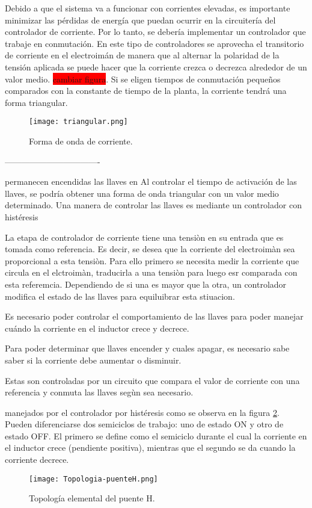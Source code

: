 Debido a que el sistema va a funcionar con corrientes elevadas, es importante minimizar las pérdidas de energía que puedan ocurrir en la circuitería del controlador de corriente. Por lo tanto, se debería implementar un controlador que trabaje en conmutación.  En este tipo de controladores se aprovecha el transitorio de corriente en el electroimán de manera que al alternar la polaridad de la tensión aplicada se puede hacer que la corriente crezca o decrezca alrededor de un valor medio. \colorbox{red}{cambiar figura}. Si se eligen tiempos de conmutación pequeños comparados con la constante de tiempo de la planta, la corriente tendrá una forma triangular.

\begin{figure}[H]
	\centering
	\texttt{[image: triangular.png]}
	\caption{Forma de onda de corriente.}
	\label{fig:img_corriente_triangular}
\end{figure}


----------------------------------

permanecen encendidas las llaves en 
Al controlar el tiempo de activación de las llaves, se podría obtener una forma de onda triangular con un valor medio determinado. Una manera de controlar las llaves es mediante un controlador con histéresis

La etapa de controlador de corriente tiene una tensiòn en su entrada que es tomada como referencia. Es decir, se desea que la corriente del electroimàn sea proporcional a esta tensiòn. Para ello primero se necesita medir la corriente que circula en el elctroimàn, traducirla a una tensiòn para luego esr comparada con esta referemcia. Dependiendo de si una es mayor que la otra, un controlador modifica el estado de las llaves para equiluibrar esta stiuacion. 

Es necesario poder controlar el comportamiento de las llaves para poder manejar cuándo la corriente en el inductor crece y decrece. 

Para poder determinar que llaves encender y cuales apagar, es necesario sabe saber si la corriente debe aumentar o disminuir.

Estas son controladas por un circuito que compara el valor de corriente con una referencia y conmuta las llaves segùn sea necesario.

 manejados por el controlador por histéresis como se observa en la figura \ref{fig:img_topologia-puenteH}. Pueden diferenciarse dos semiciclos de trabajo: uno de estado ON y otro de estado OFF. El primero se define como el semiciclo durante el cual la corriente en el inductor crece (pendiente positiva), mientras que el segundo se da cuando la corriente decrece.

\begin{figure}[H]
	\centering
	\texttt{[image: Topologia-puenteH.png]}
	\caption{Topología elemental del puente H.}
	\label{fig:img_topologia-puenteH}
\end{figure}
